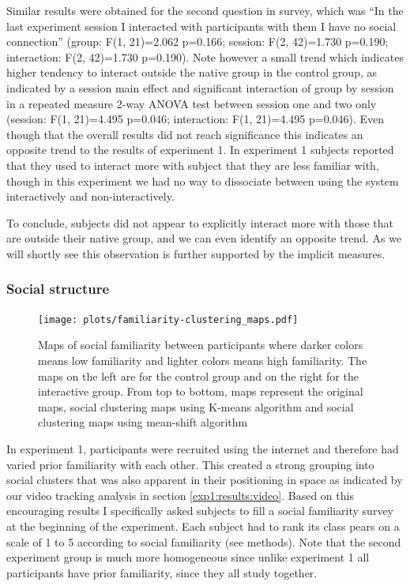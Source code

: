 \documentclass[a4paper,11pt]{article}
\begin{document}
{Similar results were obtained for the second question in survey, which was ``In the last experiment session I interacted with participants with them I have no social connection'' (group: F(1, 21)=2.062 p=0.166; session: F(2, 42)=1.730 p=0.190; interaction: F(2, 42)=1.730 p=0.190).
Note however a small trend which indicates higher tendency to interact outside the native group in the control group, as indicated by a session main effect and significant interaction of group by session in a repeated measure 2-way ANOVA test between session one and two only (session: F(1, 21)=4.495 p=0.046; interaction: F(1, 21)=4.495 p=0.046).
Even though that the overall results did not reach significance this indicates an opposite trend to the results of experiment 1.
In experiment 1 subjects reported that they used to interact more with subject that they are less familiar with, though in this experiment we had no way to dissociate between using the system interactively and non-interactively.

To conclude, subjects did not appear to explicitly interact more with those that are outside their native group, and we can even identify an opposite trend.
As we will shortly see this observation is further supported by the implicit measures.

\subsubsection{Social structure}\label{results:social_structure}

\begin{figure}[!htb]
    \centering
    \texttt{[image: plots/familiarity-clustering\_maps.pdf]}
    \caption{Maps of social familiarity between participants where darker colors means low familiarity and lighter colors means high familiarity. The maps on the left are for the control group and on the right for the interactive group. From top to bottom, maps represent the original maps, social clustering maps using K-means algorithm and social clustering maps using mean-shift algorithm}\label{plot:familiarity-clustering_maps}
\end{figure}

In experiment 1, participants were recruited using the internet and therefore had varied prior familiarity with each other.
This created a strong grouping into social clusters that was also apparent in their positioning in space as indicated by our video tracking analysis in section \ref{exp1:results:video}.
Based on this encouraging results I specifically asked subjects to fill a social familiarity survey at the beginning of the experiment.
Each subject had to rank its class pears on a scale of 1 to 5 according to social familiarity (see methods).
Note that the second experiment group is much more homogeneous since unlike experiment 1 all participants have prior familiarity, since they all study together.

}
\end{document}
